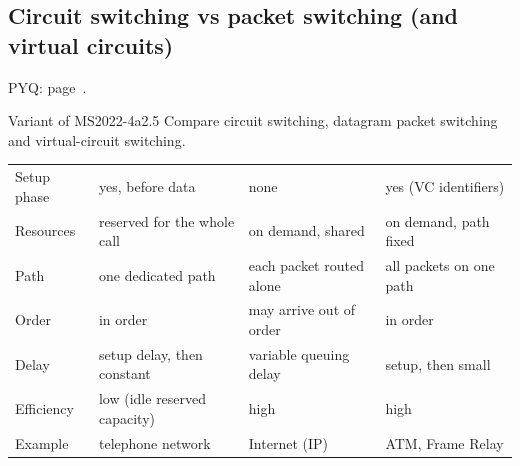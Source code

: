 \subsection{Circuit switching vs packet switching (and virtual circuits)}\label{iq:C06}
     \quad PYQ: page~\pageref{q:MS2022-4a}.
\begin{question}{Variant of MS2022-4a}{2.5}
Compare circuit switching, datagram packet switching and virtual-circuit switching.
\end{question}
\begin{solution}[outline]
\begin{center}\small\zebra
\begin{tabularx}{\linewidth}{L{24mm}YYY}\toprule
{} &  &  & \\\midrule
Setup phase & yes, before data & none & yes (VC identifiers)\\
Resources & reserved for the whole call & on demand, shared & on demand, path fixed\\
Path & one dedicated path & each packet routed alone & all packets on one path\\
Order & in order & may arrive out of order & in order\\
Delay & setup delay, then constant & variable queuing delay & setup, then small\\
Efficiency & low (idle reserved capacity) & high & high\\
Example & telephone network & Internet (IP) & ATM, Frame Relay\\\bottomrule
\end{tabularx}\end{center}
\end{solution}

